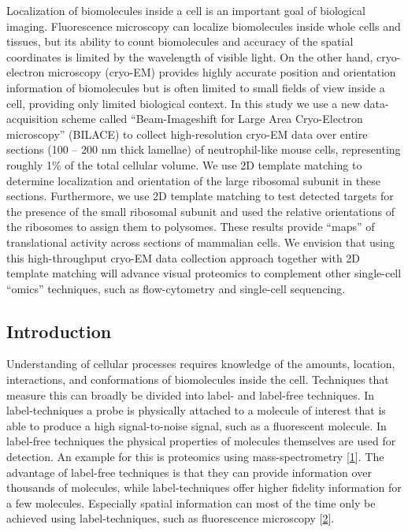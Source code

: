\documentclass[
]{article}
\begin{document}
Localization of biomolecules inside a cell is an important goal of biological imaging. Fluorescence microscopy can localize biomolecules inside whole cells and tissues, but its ability to count biomolecules and accuracy of the spatial coordinates is limited by the wavelength of visible light. On the other hand, cryo-electron microscopy (cryo-EM) provides highly accurate position and orientation information of biomolecules but is often limited to small fields of view inside a cell, providing only limited biological context. In this study we use a new data-acquisition scheme called ``Beam-Imageshift for Large Area Cryo-Electron microscopy'' (BILACE) to collect high-resolution cryo-EM data over entire sections (100 -- 200 nm thick lamellae) of neutrophil-like mouse cells, representing roughly 1\% of the total cellular volume. We use 2D template matching to determine localization and orientation of the large ribosomal subunit in these sections. Furthermore, we use 2D template matching to test detected targets for the presence of the small ribosomal subunit and used the relative orientations of the ribosomes to assign them to polysomes. These results provide ``maps'' of translational activity across sections of mammalian cells. We envision that using this high-throughput cryo-EM data collection approach together with 2D template matching will advance visual proteomics to complement other single-cell ``omics'' techniques, such as flow-cytometry and single-cell sequencing.

\hypertarget{introduction}{%
\subsection{Introduction}\label{introduction}}

Understanding of cellular processes requires knowledge of the amounts, location,
interactions, and conformations of biomolecules inside the cell. Techniques that
measure this can broadly be divided into label- and label-free techniques. In
label-techniques a probe is physically attached to a molecule of interest that
is able to produce a high signal-to-noise signal, such as a fluorescent molecule.
In label-free techniques the physical properties of molecules themselves are
used for detection. An example for this is proteomics using mass-spectrometry
{[}\protect\hyperlink{ref-tSXIKPl7}{1}{]}. The advantage of label-free techniques is that
they can provide information over thousands of molecules, while label-techniques
offer higher fidelity information for a few molecules. Especially spatial
information can most of the time only be achieved using label-techniques, such
as fluorescence microscopy {[}\protect\hyperlink{ref-VBmW7Aot}{2}{]}.
\end{document}
